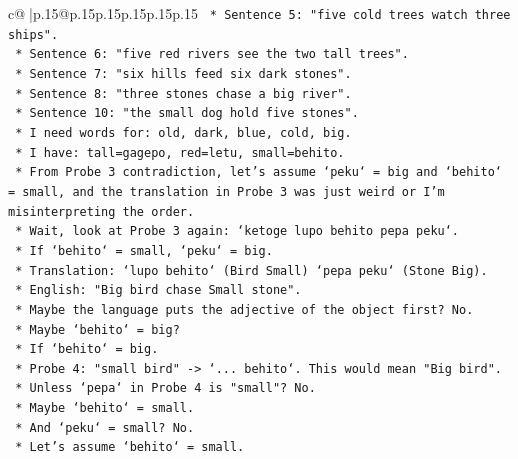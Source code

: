 \documentclass{article}
\begin{document}
{\begin{supertabular}{c@{$\;$}|p{.15\linewidth}@{}p{.15\linewidth}p{.15\linewidth}p{.15\linewidth}p{.15\linewidth}p{.15\linewidth}}
{{{\texttt{                            *   Sentence 5: "five cold trees watch three ships".} \\
\texttt{                            *   Sentence 6: "five red rivers see the two tall trees".} \\
\texttt{                            *   Sentence 7: "six hills feed six dark stones".} \\
\texttt{                            *   Sentence 8: "three stones chase a big river".} \\
\texttt{                            *   Sentence 10: "the small dog hold five stones".} \\
\texttt{                            *   I need words for: old, dark, blue, cold, big.} \\
\texttt{                            *   I have: tall=gagepo, red=letu, small=behito.} \\
\texttt{                            *   From Probe 3 contradiction, let's assume `peku` = big and `behito` = small, and the translation in Probe 3 was just weird or I'm misinterpreting the order.} \\
\texttt{                            *   Wait, look at Probe 3 again: `ketoge lupo behito pepa peku`.} \\
\texttt{                            *   If `behito` = small, `peku` = big.} \\
\texttt{                            *   Translation: `lupo behito` (Bird Small) `pepa peku` (Stone Big).} \\
\texttt{                            *   English: "Big bird chase Small stone".} \\
\texttt{                            *   Maybe the language puts the adjective of the object first? No.} \\
\texttt{                            *   Maybe `behito` = big?} \\
\texttt{                            *   If `behito` = big.} \\
\texttt{                            *   Probe 4: "small bird" {-}> `... behito`. This would mean "Big bird".} \\
\texttt{                            *   Unless `pepa` in Probe 4 is "small"? No.} \\
\texttt{                            *   Maybe `behito` = small.} \\
\texttt{                            *   And `peku` = small? No.} \\
\texttt{                            *   Let's assume `behito` = small.} \\
}}}
\end{supertabular}}
\end{document}
